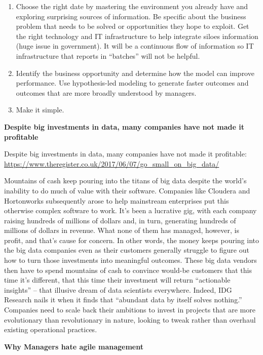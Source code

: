 \documentclass[]{book}
\providecommand{\tightlist}{%
  \setlength{\itemsep}{0pt}\setlength{\parskip}{0pt}}
\begin{document}
\begin{enumerate}
\def\labelenumi{\arabic{enumi}.}
\tightlist
\item
  Choose the right date by mastering the environment you already have and exploring surprising sources of information. Be specific about the business problem that needs to be solved or opportunities they hope to exploit. Get the right technology and IT infrastructure to help integrate siloes information (huge issue in government). It will be a continuous flow of information so IT infrastructure that reports in ``batches'' will not be helpful.
\item
  Identify the business opportunity and determine how the model can improve performance. Use hypothesis-led modeling to generate faster outcomes and outcomes that are more broadly understood by managers.
\item
  Make it simple.
\end{enumerate}

\textbf{Despite big investments in data, many companies have not made it profitable}

Despite big investments in data, many companies have not made it profitable:
\url{https://www.theregister.co.uk/2017/06/07/go_small_on_big_data/}

Mountains of cash keep pouring into the titans of big data despite the world's inability to do much of value with their software. Companies like Cloudera and Hortonworks subsequently arose to help mainstream enterprises put this otherwise complex software to work. It's been a lucrative gig, with each company raising hundreds of millions of dollars and, in turn, generating hundreds of millions of dollars in revenue. What none of them has managed, however, is profit, and that's cause for concern. In other words, the money keeps pouring into the big data companies even as their customers generally struggle to figure out how to turn those investments into meaningful outcomes. These big data vendors then have to spend mountains of cash to convince would-be customers that this time it's different, that this time their investment will return ``actionable insights'' -- that illusive dream of data scientists everywhere. Indeed, IDG Research nails it when it finds that ``abundant data by itself solves nothing.'' Companies need to scale back their ambitions to invest in projects that are more evolutionary than revolutionary in nature, looking to tweak rather than overhaul existing operational practices.

\textbf{Why Managers hate agile management}
\end{document}
